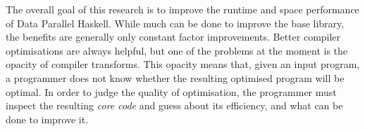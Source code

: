 The overall goal of this research is to improve the runtime and space performance of Data Parallel Haskell.
While much can be done to improve the base library, the benefits are generally only constant factor improvements.
Better compiler optimisations are always helpful, but one of the problems at the moment is the opacity of compiler transforms.
This opacity means that, given an input program,
a programmer does not know whether the resulting optimised program will be optimal.
In order to judge the quality of optimisation, the programmer must inspect the resulting \emph{core code} and guess about its efficiency, and what can be done to improve it.

